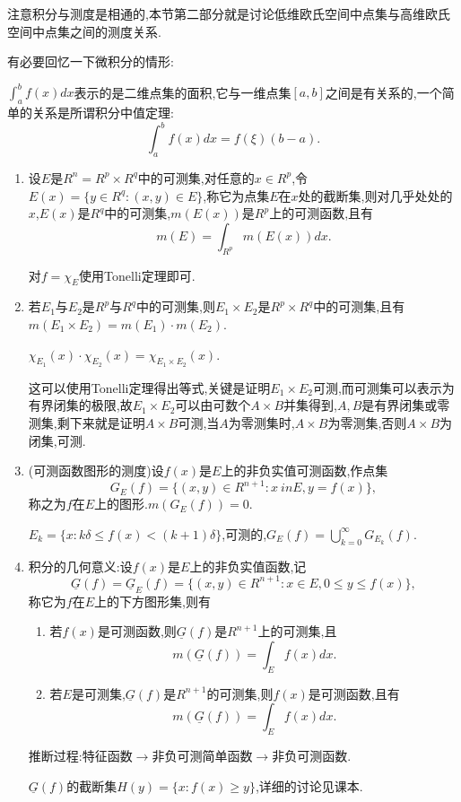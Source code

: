 \documentclass[12pt,a4paper,openany]{book}
\begin{document}
注意积分与测度是相通的,本节第二部分就是讨论低维欧氏空间中点集与高维欧氏空间中点集之间的测度关系.

有必要回忆一下微积分的情形:

$\int_{a}^{b}{f(x)dx}$表示的是二维点集的面积,它与一维点集$[a,b]$之间是有关系的,一个简单的关系是所谓积分中值定理:
\[
\int_{a}^{b}{f(x)dx} = f(\xi)(b-a).
\]

\begin{enumerate}
\item 设$E$是$R^n = R^p \times R^q$中的可测集,对任意的$x \in R^p$,令$E(x) = \{y \in R^q : (x,y) \in E\}$,称它为点集$E$在$x$处的截断集,则对几乎处处的$x$,$E(x)$是$R^q$中的可测集,$m(E(x))$是$R^p$上的可测函数,且有
\[
m(E) = \int_{R^p}{m(E(x))dx}.
\]

对$f = \chi_{E}$使用Tonelli定理即可.

\item 若$E_1$与$E_2$是$R^p$与$R^q$中的可测集,则$E_1 \times E_2$是$R^p \times R^q$中的可测集,且有$m(E_1 \times E_2) = m(E_1) \cdot m(E_2)$.

$\chi_{E_1}(x) \cdot \chi_{E_2}(x) = \chi_{E_1 \times E_2}(x)$.

这可以使用Tonelli定理得出等式,关键是证明$E_1 \times E_2$可测,而可测集可以表示为有界闭集的极限,故$E_1 \times E_2$可以由可数个$A \times B$并集得到,$A,B$是有界闭集或零测集,剩下来就是证明$A \times B$可测,当$A$为零测集时,$A \times B$为零测集,否则$A \times B$为闭集,可测.

\item (可测函数图形的测度)设$f(x)$是$E$上的非负实值可测函数,作点集
\[
G_E(f) = \{(x, y) \in R^{n+1} : x\ in E, y = f(x)\},
\]
称之为$f$在$E$上的图形.$m(G_E(f)) = 0$.

$E_k = \{x : k\delta \le f(x) < (k+1)\delta\}$,可测的,$G_E(f) = \bigcup_{k=0}^{\infty}{G_{E_k}(f)}$.

\item 积分的几何意义:设$f(x)$是$E$上的非负实值函数,记
\[
\underline{G}(f) = \underline{G}_{E}(f) = \{(x,y) \in R^{n+1}:x \in E, 0 \le y \le f(x)\},
\]
称它为$f$在$E$上的下方图形集,则有
\begin{enumerate}
\item 若$f(x)$是可测函数,则$\underline{G}(f)$是$R^{n+1}$上的可测集,且
\[
m(\underline{G}(f)) = \int_{E}{f(x)dx}.
\]

\item 若$E$是可测集,$\underline{G}(f)$是$R^{n+1}$的可测集,则$f(x)$是可测函数,且有
\[
m(\underline{G}(f)) = \int_{E}{f(x)dx}.
\]
\end{enumerate}

推断过程:特征函数$\longrightarrow$非负可测简单函数$\longrightarrow$非负可测函数.

$\underline{G}(f)$的截断集$H(y) = \{x: f(x) \ge y\}$,详细的讨论见课本.
\end{enumerate}
\end{document}
